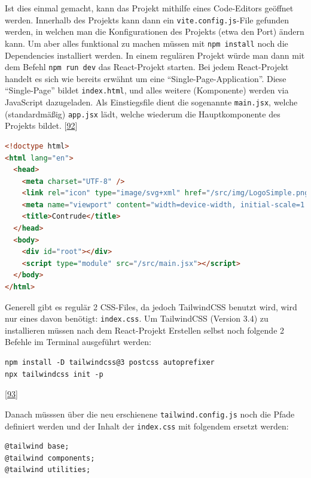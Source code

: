 \documentclass[
    headings=optiontotocandhead,%
    twoside,
    numbers=noenddot,%
    12pt, %
    titlepage, %
    parskip=full, %
    listof=leveldown, 
    numbers=noenddot, %
    a4paper,DIV=14,
    BCOR=15mm,
]{scrbook}
\newcommand{\passthrough}[1]{#1}
\begin{document}
Ist dies einmal gemacht, kann das Projekt mithilfe eines Code-Editors
geöffnet werden. Innerhalb des Projekts kann dann ein
\passthrough{\lstinline!vite.config.js!}-File gefunden werden, in
welchen man die Konfigurationen des Projekts (etwa den Port) ändern
kann. Um aber alles funktional zu machen müssen mit
\passthrough{\lstinline!npm install!} noch die Dependencies installiert
werden. In einem regulären Projekt würde man dann mit dem Befehl
\passthrough{\lstinline!npm run dev!} das React-Projekt starten. Bei
jedem React-Projekt handelt es sich wie bereits erwähnt um eine
``Single-Page-Application''. Diese ``Single-Page'' bildet
\passthrough{\lstinline!index.html!}, und alles weitere (Komponente)
werden via JavaScript dazugeladen. Als Einstiegsfile dient die
sogenannte \passthrough{\lstinline!main.jsx!}, welche (standardmäßig)
\passthrough{\lstinline!app.jsx!} lädt, welche wiederum die
Hauptkomponente des Projekts bildet.
{[}\protect\hyperlink{ref-React-CrashCourse}{92}{]}

\begin{lstlisting}[language=HTML, caption={index.html File}]
<!doctype html>
<html lang="en">
  <head>
    <meta charset="UTF-8" />
    <link rel="icon" type="image/svg+xml" href="/src/img/LogoSimple.png" />
    <meta name="viewport" content="width=device-width, initial-scale=1.0" />
    <title>Contrude</title>
  </head>
  <body>
    <div id="root"></div>
    <script type="module" src="/src/main.jsx"></script>
  </body>
</html>
\end{lstlisting}

Generell gibt es regulär 2 CSS-Files, da jedoch TailwindCSS benutzt
wird, wird nur eines davon benötigt:
\passthrough{\lstinline!index.css!}. Um TailwindCSS (Version 3.4) zu
installieren müssen nach dem React-Projekt Erstellen selbst noch
folgende 2 Befehle im Terminal ausgeführt werden:

\begin{lstlisting}[caption={TailwindCSS Installieren Befehle}]
npm install -D tailwindcss@3 postcss autoprefixer
npx tailwindcss init -p
\end{lstlisting}

{[}\protect\hyperlink{ref-TailwindCSS-Docs-ViteSetup}{93}{]}

Danach müsssen über die neu erschienene
\passthrough{\lstinline!tailwind.config.js!} noch die Pfade definiert
werden und der Inhalt der \passthrough{\lstinline!index.css!} mit
folgendem ersetzt werden:

\begin{lstlisting}[caption={Updaten der index.css für TailwindCSS}]
@tailwind base;
@tailwind components;
@tailwind utilities;
\end{lstlisting}
\end{document}
